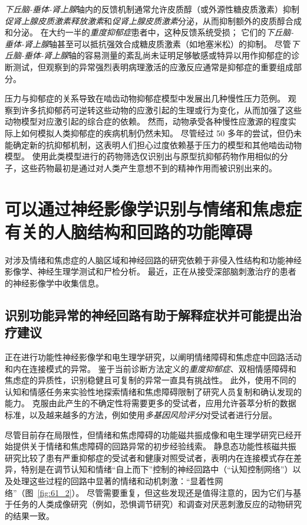 \textit{下丘脑-垂体-肾上腺}轴内的反馈机制通常允许皮质醇（或外源性糖皮质激素）抑制\textit{促肾上腺皮质激素释放激素}和\textit{促肾上腺皮质激素}分泌，从而抑制额外的皮质醇合成和分泌。
在大约一半的\textit{重度抑郁症}患者中，这种反馈系统受损；
它们的\textit{下丘脑-垂体-肾上腺}轴甚至可以抵抗强效合成糖皮质激素（如地塞米松）的抑制。
尽管\textit{下丘脑-垂体-肾上腺}轴的容易测量的紊乱尚未证明足够敏感或特异以用作抑郁症的诊断测试，但观察到的异常强烈表明病理激活的应激反应通常是抑郁症的重要组成部分。


压力与抑郁症的关系导致在啮齿动物抑郁症模型中发展出几种慢性压力范例。
观察到许多抗抑郁药可逆转这些动物的应激引起的生理或行为变化，从而加强了这些动物模型对应激引起的综合症的依赖。
然而，动物承受各种慢性应激源的程度实际上如何模拟人类抑郁症的疾病机制仍然未知。
尽管经过 50 多年的尝试，但仍未能确定新的抗抑郁机制，这表明人们担心过度依赖基于压力的模型和其他啮齿动物模型。
使用此类模型进行的药物筛选仅识别出与原型抗抑郁药物作用相似的分子，这些药物最初是通过对人类产生意想不到的精神作用而被识别出来的。



\section{可以通过神经影像学识别与情绪和焦虑症有关的人脑结构和回路的功能障碍}

对涉及情绪和焦虑症的人脑区域和神经回路的研究依赖于非侵入性结构和功能神经影像学、神经生理学测试和尸检分析。
最近，正在从接受深部脑刺激治疗的患者的神经影像学中收集信息。



\subsection{识别功能异常的神经回路有助于解释症状并可能提出治疗建议}

正在进行功能性神经影像学和电生理学研究，以阐明情绪障碍和焦虑症中回路活动和内在连接模式的异常。
鉴于当前诊断方法定义的\textit{重度抑郁症}、双相情感障碍和焦虑症的异质性，识别稳健且可复制的异常一直具有挑战性。
此外，使用不同的认知和情感任务来实验性地探索情绪和焦虑障碍限制了研究人员复制和确认发现的能力。
克服由此产生的不确定性将需要更多的受试者，应用允许荟萃分析的数据标准，以及越来越多的方法，例如使用\textit{多基因风险评分}对受试者进行分层。


尽管目前存在局限性，但情绪和焦虑障碍的功能磁共振成像和电生理学研究已经开始提供关于情绪和焦虑障碍的回路异常的初步经验线索。
静息态功能性核磁共振研究比较了患有严重抑郁症的受试者和健康对照受试者，表明内在连接模式存在差异，特别是在调节认知和情绪“自上而下”控制的神经回路中（“认知控制网络”）以及处理这些过程的回路中显著的情绪和动机刺激：“显着性网络”（图~\ref{fig:61_2}）。
尽管需要重复，但这些发现还是值得注意的，因为它们与基于任务的人类成像研究（例如，恐惧调节研究）和调查对厌恶刺激反应的动物研究的结果一致。


